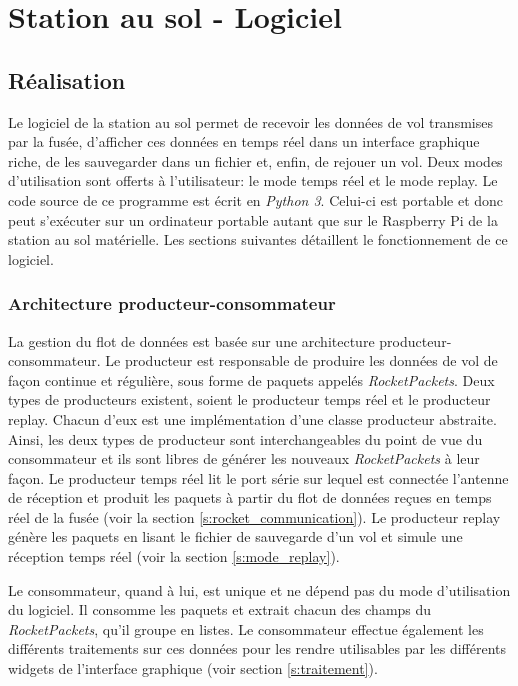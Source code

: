 \chapter{Station au sol - Logiciel}
\label{chap:sas}

\section{Réalisation}

Le logiciel de la station au sol permet de recevoir les données de vol transmises par la fusée, d'afficher ces données en temps réel dans un interface graphique riche, de les sauvegarder dans un fichier et, enfin, de rejouer un vol.
Deux modes d'utilisation sont offerts à l'utilisateur: le mode temps réel et le mode replay.
Le code source de ce programme est écrit en \textit{Python 3}.
Celui-ci est portable et donc peut s'exécuter sur un
ordinateur portable autant que sur le Raspberry Pi de la station au sol
matérielle.
Les sections suivantes détaillent le fonctionnement de ce logiciel.

\subsection{Architecture producteur-consommateur}
La gestion du flot de données est basée sur une architecture producteur-consommateur.
Le producteur est responsable de produire les données de vol de façon continue et régulière, sous forme de paquets appelés \emph{RocketPackets}.
Deux types de producteurs existent, soient le producteur temps réel et le producteur replay.
Chacun d'eux est une implémentation d'une classe producteur abstraite.
Ainsi, les deux types de producteur sont interchangeables du point de vue du consommateur et ils sont libres de générer les nouveaux \emph{RocketPackets} à leur façon.
Le producteur temps réel lit le port série sur lequel est connectée l'antenne de réception et produit les paquets à partir du flot de données reçues en temps réel de la fusée (voir la section \ref{s:rocket_communication}).
Le producteur replay génère les paquets en lisant le fichier de sauvegarde d'un vol et simule une réception temps réel (voir la section \ref{s:mode_replay}).

Le consommateur, quand à lui, est unique et ne dépend pas du mode d'utilisation du logiciel.
Il consomme les paquets et extrait chacun des champs du \emph{RocketPackets}, qu'il groupe en listes.
Le consommateur effectue également les différents traitements sur ces données pour les rendre utilisables par les différents widgets de l'interface graphique (voir section \ref{s:traitement}).

